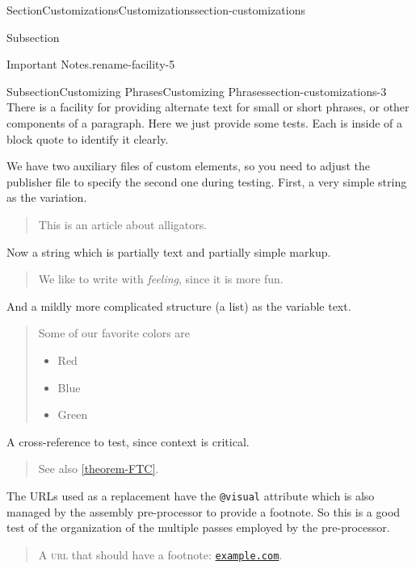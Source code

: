 \documentclass[twoside,10pt,]{article}
\newcommand{\xreffont}{\relax}
\newcommand{\mono}[1]{\texttt{#1}}
\newcommand{\initialism}[1]{\textsc{\MakeLowercase{#1}}}
\numberwithin{equation}{section}
\begin{document}
\begin{sectionptx}{Section}{Customizations}{}{Customizations}{}{}{section-customizations}
\begin{subsectionptx}{Subsection}
\begin{paragraphs}{Important Notes.}{rename-facility-5}
\end{paragraphs}%
\end{subsectionptx}
%
%
\typeout{************************************************}
\typeout{************************************************}
%
\begin{subsectionptx}{Subsection}{Customizing Phrases}{}{Customizing Phrases}{}{}{section-customizations-3}
There is a facility for providing alternate text for small or short phrases, or other components of a paragraph.  Here we just provide some tests.  Each is inside of a block quote to identify it clearly.%
\par
We have two auxiliary files of custom elements, so you need to adjust the publisher file to specify the second one during testing.  First, a very simple string as the variation.%
\begin{quote}%
This is an article about alligators.%
\end{quote}
Now a string which is partially text and partially simple markup.%
\begin{quote}%
We like to write with \emph{feeling}, since it is more fun.%
\end{quote}
And a mildly more complicated structure (a list) as the variable text.%
\begin{quote}%
Some of our favorite colors are%
\begin{itemize}[label=\textbullet]
\item{}Red%
\item{}Blue%
\item{}Green%
\end{itemize}
%
\end{quote}
A cross-reference to test, since context is critical.%
\begin{quote}%
See also \hyperref[theorem-FTC]{{\xreffont\ref{theorem-FTC}}}.%
\end{quote}
The URLs used as a replacement have the \mono{@visual} attribute which is also managed by the assembly pre-processor to provide a footnote.  So this is a good test of the organization of the multiple passes employed by the pre-processor.%
\begin{quote}%
A \initialism{URL} that should have a footnote: \href{http://example.com}{\nolinkurl{example.com}}.%
\end{quote}
\end{subsectionptx}
\end{sectionptx}
%
%
\typeout{************************************************}
\end{document}
